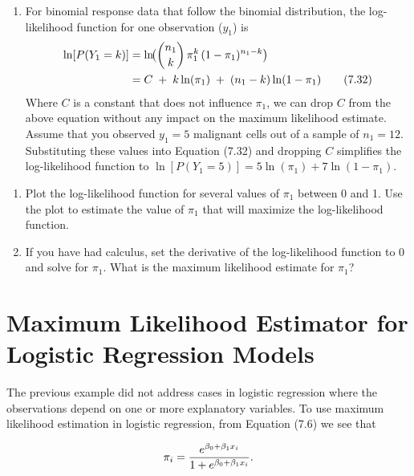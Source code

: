 \documentclass[
]{report}
\providecommand{\tightlist}{%
  \setlength{\itemsep}{0pt}\setlength{\parskip}{0pt}}
\begin{document}
\begin{enumerate}
\def\labelenumi{\arabic{enumi}.}
\setcounter{enumi}{33}
\tightlist
\item
  For binomial response data that follow the binomial distribution, the log-likelihood function for one observation (\(y_1\)) is\\
  \begin{align}
  \ln[P(Y_1 = k)]
  &= \ln\!\bigl(\binom{n_1}{k}\,\pi_1^k\,(1 - \pi_1)^{n_1 - k}\bigr) \notag \\
  &= C \;+\;k\ln(\pi_1)\;+\;(n_1 - k)\ln(1 - \pi_1)
  \tag{7.32}
  \end{align}
  Where \(C\) is a constant that does not influence \(\pi_1\), we can drop \(C\) from the above equation without any impact on the maximum likelihood estimate. Assume that you observed \(y_1 = 5\) malignant cells out of a sample of \(n_1 = 12\). Substituting these values into Equation (7.32) and dropping \(C\) simplifies the log-likelihood function to \(\ln[P(Y_1 = 5)] = 5\ln(\pi_1) + 7\ln(1 - \pi_1).\)
\end{enumerate}

\begin{enumerate}
\def\labelenumi{\alph{enumi}.}
\tightlist
\item
  Plot the log-likelihood function for several values of \(\pi_1\) between 0 and 1. Use the plot to estimate the value of \(\pi_1\) that will maximize the log-likelihood function.\\
\item
  If you have had calculus, set the derivative of the log-likelihood function to 0 and solve for \(\pi_1\). What is the maximum likelihood estimate for \(\pi_1\)?
\end{enumerate}

\section*{Maximum Likelihood Estimator for Logistic Regression Models}\label{maximum-likelihood-estimator-for-logistic-regression-models}

The previous example did not address cases in logistic regression where the observations depend on one or more explanatory variables. To use maximum likelihood estimation in logistic regression, from Equation (7.6) we see that

\[
\pi_i = \frac{e^{\beta_0 + \beta_1 x_i}}{1 + e^{\beta_0 + \beta_1 x_i}}.
\notag
\]
\end{document}
